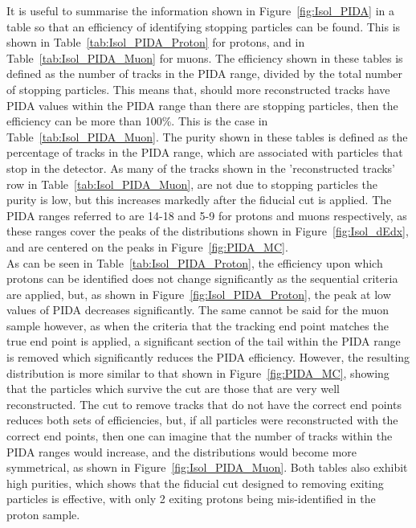 
It is useful to summarise the information shown in Figure~\ref{fig:Isol_PIDA} in a table so that an efficiency of identifying stopping particles can be found. This is shown in Table~\ref{tab:Isol_PIDA_Proton} for protons, and in Table~\ref{tab:Isol_PIDA_Muon} for muons. The efficiency shown in these tables is defined as the number of tracks in the PIDA range, divided by the total number of stopping particles. This means that, should more reconstructed tracks have PIDA values within the PIDA range than there are stopping particles, then the efficiency can be more than 100\%. This is the case in Table~\ref{tab:Isol_PIDA_Muon}. The purity shown in these tables is defined as the percentage of tracks in the PIDA range, which are associated with particles that stop in the detector. As many of the tracks shown in the 'reconstructed tracks' row in Table~\ref{tab:Isol_PIDA_Muon}, are not due to stopping particles the purity is low, but this increases markedly after the fiducial cut is applied. The PIDA ranges referred to are 14-18 and 5-9 for protons and muons respectively, as these ranges cover the peaks of the distributions shown in Figure~\ref{fig:Isol_dEdx}, and are centered on the peaks in Figure~\ref{fig:PIDA_MC}. \\

As can be seen in Table~\ref{tab:Isol_PIDA_Proton}, the efficiency upon which protons can be identified does not change significantly as the sequential criteria are applied, but, as shown in Figure~\ref{fig:Isol_PIDA_Proton}, the peak at low values of PIDA decreases significantly. The same cannot be said for the muon sample however, as when the criteria that the tracking end point matches the true end point is applied, a significant section of the tail within the PIDA range is removed which significantly reduces the PIDA efficiency. However, the resulting distribution is more similar to that shown in Figure~\ref{fig:PIDA_MC}, showing that the particles which survive the cut are those that are very well reconstructed. The cut to remove tracks that do not have the correct end points reduces both sets of efficiencies, but, if all particles were reconstructed with the correct end points, then one can imagine that the number of tracks within the PIDA ranges would increase, and the distributions would become more symmetrical, as shown in Figure~\ref{fig:Isol_PIDA_Muon}. Both tables also exhibit high purities, which shows that the fiducial cut designed to removing exiting particles is effective, with only 2 exiting protons being mis-identified in the proton sample. \\

